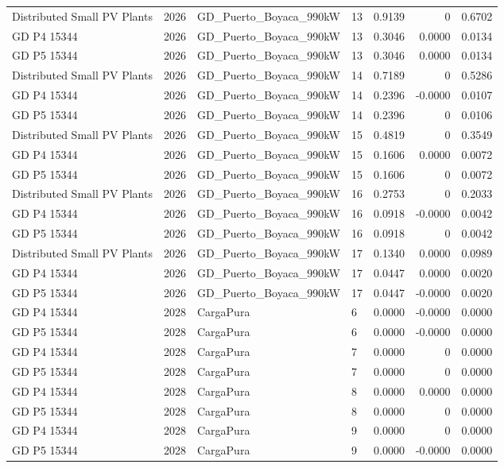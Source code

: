 \documentclass[11pt,a4paper]{article}
\begin{document}
\begin{longtable}{llllrrr}
Distributed Small PV Plants & 2026 & GD\_Puerto\_Boyaca\_990kW & 13 & 0.9139 & 0 & 0.6702 \\
GD P4 15344 & 2026 & GD\_Puerto\_Boyaca\_990kW & 13 & 0.3046 & 0.0000 & 0.0134 \\
GD P5 15344 & 2026 & GD\_Puerto\_Boyaca\_990kW & 13 & 0.3046 & 0.0000 & 0.0134 \\
Distributed Small PV Plants & 2026 & GD\_Puerto\_Boyaca\_990kW & 14 & 0.7189 & 0 & 0.5286 \\
GD P4 15344 & 2026 & GD\_Puerto\_Boyaca\_990kW & 14 & 0.2396 & -0.0000 & 0.0107 \\
GD P5 15344 & 2026 & GD\_Puerto\_Boyaca\_990kW & 14 & 0.2396 & 0 & 0.0106 \\
Distributed Small PV Plants & 2026 & GD\_Puerto\_Boyaca\_990kW & 15 & 0.4819 & 0 & 0.3549 \\
GD P4 15344 & 2026 & GD\_Puerto\_Boyaca\_990kW & 15 & 0.1606 & 0.0000 & 0.0072 \\
GD P5 15344 & 2026 & GD\_Puerto\_Boyaca\_990kW & 15 & 0.1606 & 0 & 0.0072 \\
Distributed Small PV Plants & 2026 & GD\_Puerto\_Boyaca\_990kW & 16 & 0.2753 & 0 & 0.2033 \\
GD P4 15344 & 2026 & GD\_Puerto\_Boyaca\_990kW & 16 & 0.0918 & -0.0000 & 0.0042 \\
GD P5 15344 & 2026 & GD\_Puerto\_Boyaca\_990kW & 16 & 0.0918 & 0 & 0.0042 \\
Distributed Small PV Plants & 2026 & GD\_Puerto\_Boyaca\_990kW & 17 & 0.1340 & 0.0000 & 0.0989 \\
GD P4 15344 & 2026 & GD\_Puerto\_Boyaca\_990kW & 17 & 0.0447 & 0.0000 & 0.0020 \\
GD P5 15344 & 2026 & GD\_Puerto\_Boyaca\_990kW & 17 & 0.0447 & -0.0000 & 0.0020 \\
GD P4 15344 & 2028 & CargaPura & 6 & 0.0000 & -0.0000 & 0.0000 \\
GD P5 15344 & 2028 & CargaPura & 6 & 0.0000 & -0.0000 & 0.0000 \\
GD P4 15344 & 2028 & CargaPura & 7 & 0.0000 & 0 & 0.0000 \\
GD P5 15344 & 2028 & CargaPura & 7 & 0.0000 & 0 & 0.0000 \\
GD P4 15344 & 2028 & CargaPura & 8 & 0.0000 & 0.0000 & 0.0000 \\
GD P5 15344 & 2028 & CargaPura & 8 & 0.0000 & 0 & 0.0000 \\
GD P4 15344 & 2028 & CargaPura & 9 & 0.0000 & 0 & 0.0000 \\
GD P5 15344 & 2028 & CargaPura & 9 & 0.0000 & -0.0000 & 0.0000 \\

\end{longtable}
\end{document}
